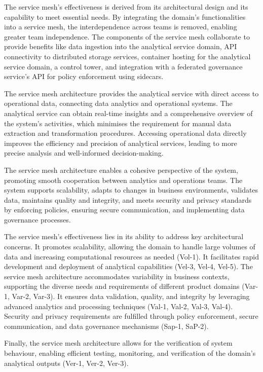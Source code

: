 \documentclass[journal]{IEEEtran}
\begin{document}
\begin{enumerate}
    The service mesh's effectiveness is derived from its architectural design and its capability to meet essential needs. By integrating the domain's functionalities into a service mesh, the interdependence across teams is removed, enabling greater team independence. The components of the service mesh collaborate to provide benefits like data ingestion into the analytical service domain, API connectivity to distributed storage services, container hosting for the analytical service domain, a control tower, and integration with a federated governance service's API for policy enforcement using sidecars.
    
    The service mesh architecture provides the analytical service with direct access to operational data, connecting data analytics and operational systems. The analytical service can obtain real-time insights and a comprehensive overview of the system's activities, which minimises the requirement for manual data extraction and transformation procedures. Accessing operational data directly improves the efficiency and precision of analytical services, leading to more precise analysis and well-informed decision-making.
    
    The service mesh architecture enables a cohesive perspective of the system, promoting smooth cooperation between analytics and operations teams. The system supports scalability, adapts to changes in business environments, validates data, maintains quality and integrity, and meets security and privacy standards by enforcing policies, ensuring secure communication, and implementing data governance processes.

    The service mesh's effectiveness lies in its ability to address key architectural concerns. It promotes scalability, allowing the domain to handle large volumes of data and increasing computational resources as needed (Vol-1). It facilitates rapid development and deployment of analytical capabilities (Vel-3, Vel-4, Vel-5). The service mesh architecture accommodates variability in business contexts, supporting the diverse needs and requirements of different product domains (Var-1, Var-2, Var-3). It ensures data validation, quality, and integrity by leveraging advanced analytics and processing techniques (Val-1, Val-2, Val-3, Val-4). Security and privacy requirements are fulfilled through policy enforcement, secure communication, and data governance mechanisms (Sap-1, SaP-2). 
    
    Finally, the service mesh architecture allows for the verification of system behaviour, enabling efficient testing, monitoring, and verification of the domain's analytical outputs (Ver-1, Ver-2, Ver-3).


\end{enumerate}
\end{document}
